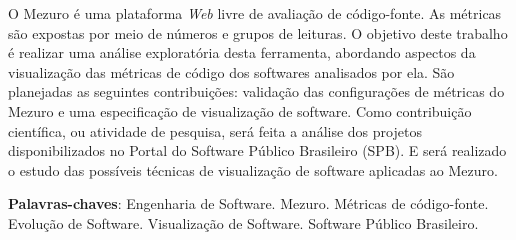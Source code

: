 \begin{resumo}
 O Mezuro é uma plataforma \textit{Web} livre de avaliação de código-fonte.
 As métricas são expostas por meio de números e grupos de leituras.
 O objetivo deste trabalho é realizar uma análise exploratória desta ferramenta,
 abordando aspectos da visualização das métricas de código dos softwares
 analisados por ela.
 São planejadas as seguintes contribuições: validação das configurações de
 métricas do Mezuro e uma especificação de visualização de software.
 Como contribuição científica, ou atividade de pesquisa, será feita a análise
 dos projetos disponibilizados no Portal do Software Público Brasileiro (SPB).
 E será realizado o estudo das possíveis técnicas de visualização de software
 aplicadas ao Mezuro.

 \vspace{\onelineskip}

 \noindent
 \textbf{Palavras-chaves}: Engenharia de Software. Mezuro.
 Métricas de código-fonte. Evolução de Software. Visualização de Software.
 Software Público Brasileiro.
\end{resumo}
